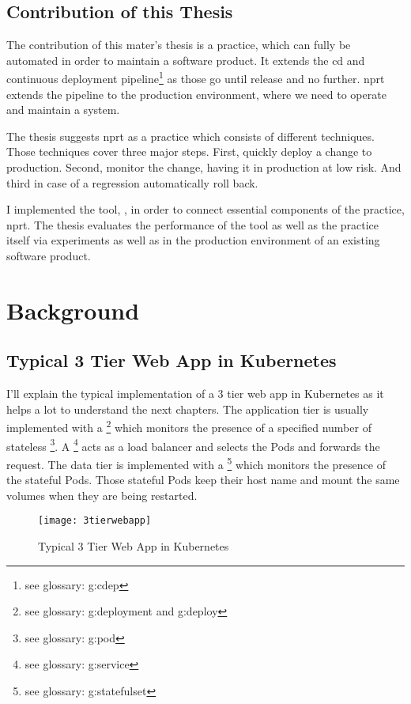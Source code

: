 \section{Contribution of this Thesis}

The contribution of this mater's thesis is a practice, which can fully be automated in
order to maintain a software product. It extends the \gls{cd} and continuous deployment
pipeline\footnote{see glossary: \gls{g:cdep}} as those go until release and no
further. \gls{nprt} extends the pipeline to the production environment, where we need to
operate and maintain a system.

The thesis suggests \gls{nprt} as a practice which consists of different techniques. Those
techniques cover three major steps. First, quickly deploy a change to production. Second,
monitor the change, having it in production at low risk. And third in case of a regression
automatically roll back.

I implemented the tool, \deployer, in order to connect essential components of the
practice, \gls{nprt}. The thesis evaluates the performance of the tool as well as the
practice itself via experiments as well as in the production environment of an existing
software product.

\chapter{Background}
\label{chap:background}

\section{Typical 3 Tier Web App in Kubernetes}

I'll explain the typical implementation of a 3 tier web app in Kubernetes as it helps a
lot to understand the next chapters. The application tier is usually implemented with a
\footnote{see glossary: \gls{g:deployment} and \gls{g:deploy}} which
monitors the presence of a specified number of stateless \footnote{see
  glossary: \gls{g:pod}}. A \footnote{see glossary: \gls{g:service}} acts as
a load balancer and selects the Pods and forwards the request. The data tier is
implemented with a \footnote{see glossary: \gls{g:statefulset}} which
monitors the presence of the stateful Pods. Those stateful Pods keep their host name and
mount the same volumes when they are being restarted.

\begin{figure}[htbp]
  \centering
  \texttt{[image: 3tierwebapp]}
  \caption{Typical 3 Tier Web App in Kubernetes}
  \label{fig:3tierwebapp}
\end{figure}

